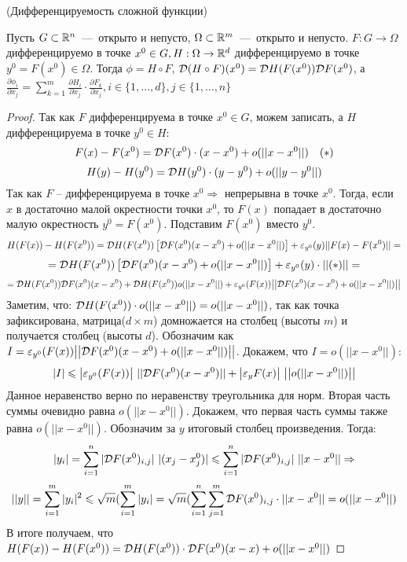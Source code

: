 \begin{theorem} \hypertarget{thrm2.1}{(Дифференцируемость сложной функции)}
    Пусть $G \subset \mathbb{R}^n$~---~открыто и непусто, $\Omega \subset \mathbb{R}^m$~---~открыто и непусто. $F: G \rightarrow \Omega$ дифференцируемо в точке $x^0 \in G, H: \Omega \rightarrow \mathbb{R}^d$ дифференцируемо в точке $y^0 = F(x^0) \in \Omega$. Тогда $\phi = H \circ F$, $\mathcal{D}(H \circ F)(x^0) = \mathcal{D} H(F(x^0)) \mathcal{D} F(x^0)$, а $\frac{\partial \phi_i}{\partial x_j} = \sum \limits_{k = 1}^m \frac{\partial H_i}{\partial x_j} \cdot \frac{\partial F_k}{\partial x_j}, i \in \{1, \dots, d\}, j \in \{1, \dots, n\}$
\end{theorem}
\begin{proof}
    Так как $F$ дифференцируема в точке $x^0 \in G$, можем записать, а $H$ дифференцируема в точке $y^0 \in H$: $$ F(x) - F(x^0) = \mathcal{D} F(x^0) \cdot (x - x^0) + o(||x - x^0||)\quad(*)$$
    $$H(y) - H(y^0) = \mathcal{D} H(y^0)\cdot (y - y^0) + o(||y - y^0||)$$
    Так как $F$ -- дифференцируема в точке $x^0 \Rightarrow$ непрерывна в точке $x^0$. Тогда, если $x$ в достаточно малой окрестности точки $x^0$, то $F(x)$ попадает в достаточно малую окрестность $y^0 = F(x^0)$. Подставим $F(x^0)$ вместо $y^0$. $$H(F(x)) - H(F(x^0)) = \mathcal{D} H(F(x^0))\left[\mathcal{D} F(x^0)(x - x^0) + o(||x - x^0||)\right] + \varepsilon_{y^0}(y)|| F(x) - F(x^0)|| = $$ $$ = \mathcal{D} H(F(x^0))\left[\mathcal{D} F(x^0)(x - x^0) + o(||x - x^0||)\right] + \varepsilon_{y^0}(y)\cdot||(*)|| = $$ $$ = \mathcal{D} H(F(x^0)) \mathcal{D} F(x^0)(x - x^0) +\mathcal{D} H(F(x^0))o(||x - x^0||) + \varepsilon_{y^0}(F(x)) \big|\big| \mathcal{D} F(x^0)(x - x^0) + o(||x - x^0||)\big|\big|$$
    Заметим, что: $\mathcal{D} H(F(x^0)) \cdot o(||x - x^0||) = o(||x - x^0||)$, так как точка зафиксирована, матрица($d \times m$) домножается на столбец (высоты $m$) и получается столбец (высоты $d$). \newline 
    Обозначим как $I = \varepsilon_{y^0}(F(x))\big|\big|\mathcal{D} F(x^0)(x - x^0) + o(||x - x^0||)\big|\big|$. Докажем, что $I = o(||x - x^0||)$: $$|I| \leq \big|\epsilon_{y^0}(F(x))\big| \ ||\D F(x^0)(x - x^0)|| + \big |\epsilon_y F(x) \big| \ \big|\big|o(||x - x^0||)\big|\big| $$
    Данное неравенство верно по неравенству треугольника для норм. 
    Вторая часть суммы очевидно равна $o(||x - x^0||)$. Докажем, что первая часть суммы также равна $o(||x - x^0||)$. Обозначим за $y$ итоговый столбец произведения. Тогда: $$|y_i| = \sum\limits_{i = 1}^n |\mathcal{D} F(x^0)_{i, j}| \ |(x_j - x^0_j)| \leqslant \sum\limits_{i = 1}^n |\mathcal{D} F(x^0)_{i, j}| \ ||x - x^0|| \Rightarrow $$ $$ ||y|| = \sum\limits_{i = 1}^m |y_i|^2 \leqslant \sqrt{m} (\sum\limits_{i = 1}^m |y_i| = \sqrt{m}(\sum\limits_{i = 1}^n \sum\limits_{j = 1}^m \mathcal{D} F(x^0)_{i, j} \cdot ||x - x^0|| = o(||x - x^0||)$$
    В итоге получаем, что $H(F(x)) - H(F(x^0)) = \mathcal{D} H(F(x^0)) \cdot \mathcal{D} F(x^0)(x - x) + o(||x - x^0||)$
\end{proof}
